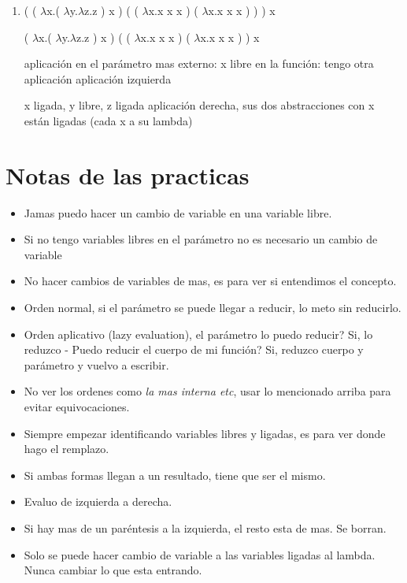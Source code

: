 \begin{enumerate}
    
    \item ( ( $\lambda$x.( $\lambda$y.$\lambda$z.z ) x ) ( ( $\lambda$x.x x x ) ( $\lambda$x.x x x ) ) ) x %
    
      ( $\lambda$x.( $\lambda$y.$\lambda$z.z ) x ) ( ( $\lambda$x.x x x ) ( $\lambda$x.x x x ) )  x
    
    aplicación
    en el parámetro mas externo: x libre
	en la función:
    tengo otra aplicación    
    aplicación izquierda 
    
    x ligada, y libre, z ligada
    aplicación derecha, sus dos abstracciones con x están ligadas (cada x a su lambda)
  
\end{enumerate}
 
\section*{Notas de las practicas}

\begin{itemize}
\item Jamas puedo hacer un cambio de variable en una variable libre.
\item Si no tengo variables libres en el parámetro no es necesario un cambio de variable
\item No hacer cambios de variables de mas, es para ver si entendimos el concepto.
\item Orden normal, si el parámetro se puede llegar a reducir, lo meto sin reducirlo. 
\item Orden aplicativo (lazy evaluation), el parámetro lo puedo reducir? Si, lo reduzco - Puedo reducir el cuerpo de mi función? Si, reduzco cuerpo y parámetro y vuelvo a escribir.
\item No ver los ordenes como \textit{la mas interna etc}, usar lo mencionado arriba para evitar equivocaciones.
\item Siempre empezar identificando variables libres y ligadas, es para ver donde hago el remplazo.
\item Si ambas formas llegan a un resultado, tiene que ser el mismo.
\item Evaluo de izquierda a derecha.
\item Si hay mas de un paréntesis a la izquierda, el resto esta de mas. Se borran.
\item Solo se puede hacer cambio de variable a las variables ligadas al lambda. Nunca cambiar lo que esta entrando.
\end{itemize}


